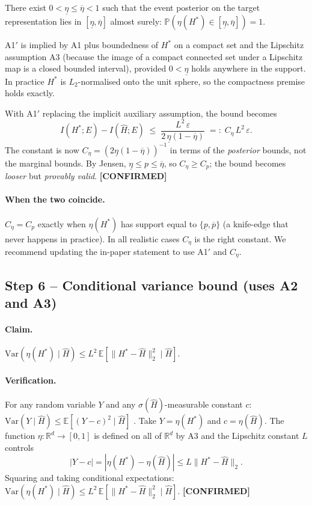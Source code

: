 \documentclass[11pt]{article}
\newcommand{\R}{\mathbb{R}}
\newcommand{\E}{\mathbb{E}}
\newcommand{\PP}{\mathbb{P}}
\newcommand{\Var}{\mathrm{Var}}
\newcommand{\CONF}{{\color{black!60!green}\textbf{[CONFIRMED]}}}
\begin{document}
\begin{description}[leftmargin=2em,style=nextline]
\item[(A1$'$) Calibrated event posterior.]
There exist $0<\underline\eta\le\overline\eta<1$ such that the event
posterior on the target representation lies in
$[\underline\eta,\overline\eta]$ almost surely:
$\PP(\eta(H^*)\in[\underline\eta,\overline\eta])=1$.
\end{description}

A1$'$ is implied by A1 plus boundedness of $H^*$ on a compact set and
the Lipschitz assumption A3 (because the image of a compact connected set
under a Lipschitz map is a closed bounded interval), provided
$0<\underline\eta$ holds anywhere in the support. In practice $H^*$ is
$L_2$-normalised onto the unit sphere, so the compactness premise holds
exactly.

With A1$'$ replacing the implicit auxiliary assumption, the bound becomes
\begin{equation}\label{eq:jensen-fixed}
I(H^*;E)-I(\hat H;E)\;\le\;\frac{L^2\,\varepsilon}{2\,\underline\eta(1-\overline\eta)}
\;=:\;C_\eta\,L^2\,\varepsilon.
\end{equation}
The constant is now $C_\eta=(2\underline\eta(1-\overline\eta))^{-1}$
in terms of the \emph{posterior} bounds, not the marginal bounds. By
Jensen, $\underline\eta\le p\le\overline\eta$, so
$C_\eta\ge C_p$; the bound becomes \emph{looser} but
\emph{provably valid}. \CONF

\paragraph{When the two coincide.}
$C_\eta=C_p$ exactly when $\eta(H^*)$ has support equal to
$\{\underline p,\overline p\}$ (a knife-edge that never happens in
practice). In all realistic cases $C_\eta$ is the right
constant. We recommend updating the in-paper statement to use A1$'$ and
$C_\eta$.

\subsection{Step 6 -- Conditional variance bound (uses A2 and A3)}

\paragraph{Claim.}
$\Var(\eta(H^*)\mid \hat H)\le L^2\,\E[\|H^*-\hat H\|_2^2\mid \hat H]$.

\paragraph{Verification.}
For any random variable $Y$ and any $\sigma(\hat H)$-measurable constant
$c$: $\Var(Y\mid\hat H)\le \E[(Y-c)^2\mid\hat H]$
\citep[Thm.~2.4.2]{Durrett2019}. Take $Y=\eta(H^*)$ and
$c=\eta(\hat H)$. The function $\eta\colon\R^d\to[0,1]$ is defined on all
of $\R^d$ by A3 and the Lipschitz constant $L$ controls
\[
|Y-c|=|\eta(H^*)-\eta(\hat H)|\le L\|H^*-\hat H\|_2.
\]
Squaring and taking conditional expectations:
$\Var(\eta(H^*)\mid\hat H)\le L^2\,\E[\|H^*-\hat H\|_2^2\mid\hat H]$. \CONF
\end{document}
